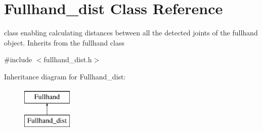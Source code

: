 \hypertarget{classFullhand__dist}{
\section{Fullhand\_\-dist Class Reference}
\label{classFullhand__dist}
}


class enabling calculating distances between all the detected joints of the fullhand object. Inherits from the fullhand class  




{\ttfamily \#include $<$fullhand\_\-dist.h$>$}

Inheritance diagram for Fullhand\_\-dist:\begin{figure}[H]
\begin{center}
\leavevmode
\includegraphics[height=2.000000cm]{classFullhand__dist}
\end{center}
\end{figure}
